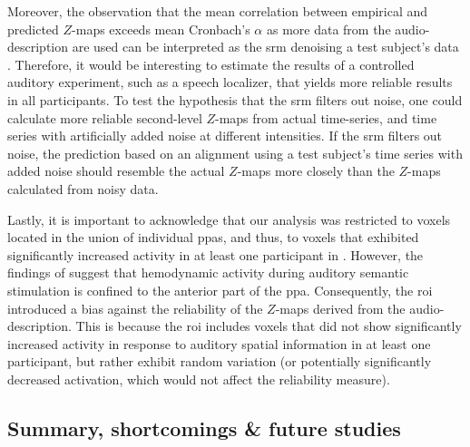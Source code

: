%
Moreover, the observation that the mean correlation between empirical and
predicted $Z$-maps exceeds mean Cronbach's $\alpha$ as more data from the
audio-description are used can be interpreted as the \ac{srm} denoising a test
subject's data \citep[cf.][]{chen2015reduced}.
%
Therefore, it would be interesting to estimate the results of a controlled
auditory experiment, such as a speech localizer, that yields more reliable
results in all participants.
%
To test the hypothesis that the \ac{srm} filters out noise, one could calculate
more reliable second-level $Z$-maps from actual time-series, and time series
with artificially added noise at different intensities.
%
If the \ac{srm} filters out noise, the prediction based on an alignment using a
test subject's time series with added noise should resemble the actual $Z$-maps
more closely than the $Z$-maps calculated from noisy data.


\pagebreak

%
Lastly, it is important to acknowledge that our analysis was restricted to
voxels located in the union of individual \acp{ppa}, and thus, to voxels that
exhibited significantly increased activity in at least one participant in
\citet{sengupta2016extension}.
%
However, the findings of \citet{haeusler2022processing} suggest that hemodynamic
activity during auditory semantic stimulation is confined to the anterior part
of the \ac{ppa}.
%
Consequently, the \ac{roi} introduced a bias against the reliability of the
$Z$-maps derived from the audio-description.
%
This is because the \ac{roi} includes voxels that did not show significantly
increased activity in response to auditory spatial information in at least one
participant, but rather exhibit random variation (or potentially significantly
decreased activation, which would not affect the reliability measure).


\subsection{Summary, shortcomings \& future studies}

